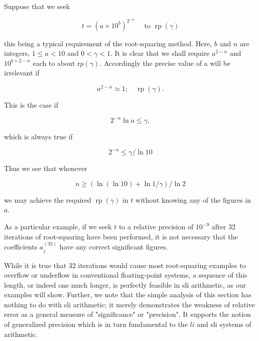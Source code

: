 \documentclass[10pt]{article}
\begin{document}
Suppose that we seek


\begin{equation*}
t=\left(a \times 10^{b}\right)^{2^{-n}} \quad \text { to } \operatorname{rp}(\gamma) \tag{4.3}
\end{equation*}


this being a typical requirement of the root-squaring method. Here, $b$ and $n$ are integers, $1 \leq a<10$ and $0<\gamma<1$. It is clear that we shall require $a^{2-n}$ and $10^{b \times 2-n}$ each to about $\mathrm{r} p(\gamma)$. Accordingly the precise value of a will be irrelevant if


\begin{equation*}
a^{2-n} \approx 1 ; \quad \operatorname{rp}(\gamma) . \tag{4.4}
\end{equation*}


This is the case if


\begin{equation*}
2^{-n} \ln a \leq \gamma, \tag{4.5}
\end{equation*}


which is always true if


\begin{equation*}
2^{-n} \leq \gamma / \ln 10 \tag{4.6}
\end{equation*}


Thus we see that whenever


\begin{equation*}
n \geq(\ln (\ln 10)+\ln 1 / \gamma) / \ln 2 \tag{4.7}
\end{equation*}


we may achieve the required $\operatorname{rp}(\gamma)$ in $t$ without knowing any of the figures in $a$.

As a particular example, if we seek $t$ to a relative precision of $10^{-9}$ after 32 iterations of root-squaring have been performed, it is not necessary that the coefficients $a_{j}^{(32)}$ have any correct significant figures.

While it is true that 32 iterations would cause most root-squaring examples to overflow or underflow in conventional floating-point systems, a sequence of this length, or indeed one much longer, is perfectly feasible in sli arithmetic, as our examples will show. Further, we note that the simple analysis of this section has nothing to do with sli arithmetic; it merely demonstrates the weakness of relative error as a general measure of "significance" or "precision". It supports the notion of generalized precision which is in turn fundamental to the $l i$ and sli systems of arithmetic.
\end{document}
